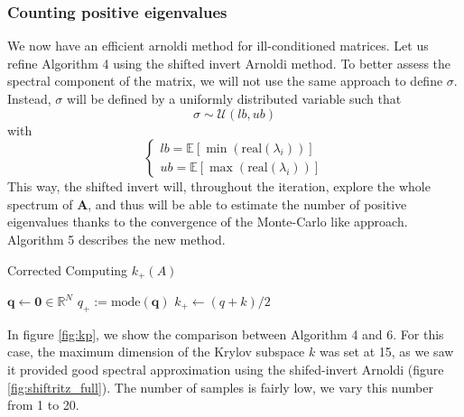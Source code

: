 \documentclass[11pt]{article}
\numberwithin{equation}{section}
\begin{document}
\subsubsection{Counting positive eigenvalues}
We now have an efficient arnoldi method for ill-conditioned matrices. Let us refine Algorithm 4 using the shifted invert Arnoldi method. To better assess the spectral component of the matrix, we will not use the same approach to define $\sigma$. Instead, $\sigma$ will be defined by a uniformly distributed variable such that $$\sigma\sim\mathcal{U}(lb,ub)$$ with 
\begin{equation*}
    \begin{cases}
        lb = \mathbb{E}\left[\min(\text{real}(\lambda_i))\right] \\
        ub = \mathbb{E}\left[\max(\text{real}(\lambda_i))\right]
    \end{cases}
\end{equation*}
This way, the shifted invert will, throughout the iteration, explore the whole spectrum of $\mathbf{A}$, and thus will be able to estimate the number of positive eigenvalues thanks to the convergence of the Monte-Carlo like approach. Algorithm 5 describes the new method.
\begin{algorithm2e}
    \SetAlgoLined
    \caption{Corrected Computing $k_{+}(A)$}
    $\mathbf{q} \gets \mathbf{0}\in\mathbb{R}^{N}$\;
    $q_+ := \text{mode}(\mathbf{q}) $\;
    $k_+\gets (q+k)/2$
\end{algorithm2e}

In figure \ref{fig:kp}, we show the comparison between Algorithm 4 and 6. For this case, the maximum dimension of the Krylov subspace $k$ was set at 15, as we saw it provided good spectral approximation using the shifed-invert Arnoldi (figure \ref{fig:shiftritz_full}). The number of samples is fairly low, we vary this number from 1 to 20. 
\end{document}
